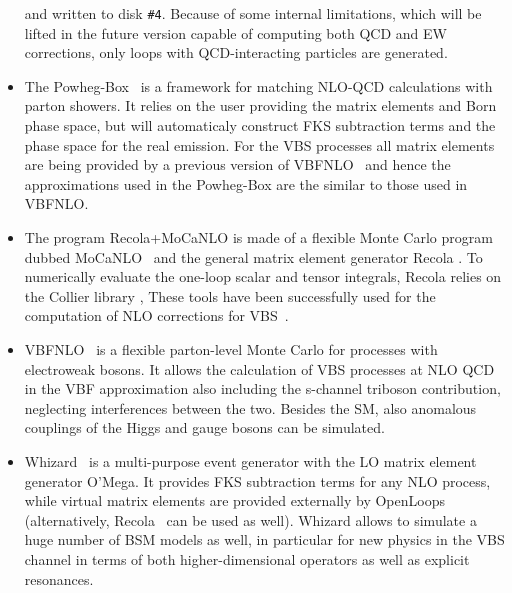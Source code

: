\begin{itemize}
        and written to disk {\tt \#4}. Because of some internal limitations, which will be lifted in the future version capable of computing both QCD and EW corrections, 
        only loops with QCD-interacting particles are generated.
  \item The {\sc Powheg-Box}~\cite{Alioli:2010xd,Frixione:2007vw} is a framework for matching NLO-QCD calculations with parton showers.
It relies on the user providing the matrix elements and Born phase space, but will automaticaly construct FKS %
subtraction terms and the phase space for the real emission.
For the VBS processes all matrix elements are being provided by a previous version of {\sc VBFNLO}~\cite{Arnold:2008rz, Arnold:2011wj, Baglio:2014uba} and hence the approximations used in the {\sc Powheg-Box} are the similar to those used in {\sc VBFNLO}.

  \item The program {\sc Recola+MoCaNLO} is made of a flexible Monte Carlo program dubbed {\sc MoCaNLO}~\cite{MoCaNLO} and the general matrix element generator {\sc Recola} \cite{Actis:2012qn,Actis:2016mpe}.
To numerically evaluate the one-loop scalar and tensor integrals, {\sc Recola} relies on the {\sc Collier} library \cite{Denner:2014gla,Denner:2016kdg},
These tools have been successfully used for the computation of NLO corrections for VBS~\cite{Biedermann:2016yds,Biedermann:2017bss}.

  \item {\sc VBFNLO}~\cite{Arnold:2008rz, Arnold:2011wj, Baglio:2014uba} is a flexible
parton-level Monte Carlo for processes with electroweak bosons. It
allows the calculation of VBS processes at NLO QCD in the VBF
approximation also including the s-channel triboson contribution,
neglecting interferences between the two. Besides the SM, also anomalous
couplings of the Higgs and gauge bosons can be simulated.

  \item {\sc Whizard}~\cite{Moretti:2001zz,Kilian:2007gr} is a multi-purpose
event generator with the LO matrix element generator {\sc O'Mega}. It
provides FKS subtraction terms for any NLO process, while virtual matrix
elements are provided externally by {\sc
OpenLoops}~\cite{Cascioli:2011va} (alternatively, {\sc Recola}~\cite{Actis:2012qn,Actis:2016mpe}
can be used as well). {\sc Whizard} allows to simulate a
huge number of BSM models as well, in particular for new physics in
the VBS channel in terms of both higher-dimensional operators as well as explicit
resonances.

\end{itemize}

